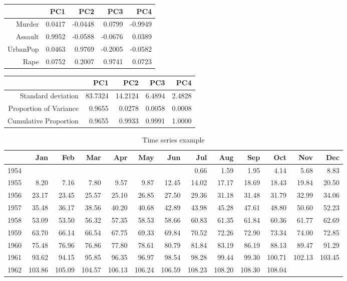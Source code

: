 \begin{table}[ht]
\centering
\begin{tabular}{rrrrr}
  \hline
 & PC1 & PC2 & PC3 & PC4 \\ 
  \hline
Murder & 0.0417 & -0.0448 & 0.0799 & -0.9949 \\ 
  Assault & 0.9952 & -0.0588 & -0.0676 & 0.0389 \\ 
  UrbanPop & 0.0463 & 0.9769 & -0.2005 & -0.0582 \\ 
  Rape & 0.0752 & 0.2007 & 0.9741 & 0.0723 \\ 
   \hline
\end{tabular}
\end{table}
\begin{table}[ht]
\centering
\begin{tabular}{rrrrr}
  \hline
 & PC1 & PC2 & PC3 & PC4 \\ 
  \hline
Standard deviation & 83.7324 & 14.2124 & 6.4894 & 2.4828 \\ 
  Proportion of Variance & 0.9655 & 0.0278 & 0.0058 & 0.0008 \\ 
  Cumulative Proportion & 0.9655 & 0.9933 & 0.9991 & 1.0000 \\ 
   \hline
\end{tabular}
\end{table}
\begin{table}[h]
\centering
\caption{Time series example} 
\begin{tabular}{rrrrrrrrrrrrr}
  \hline
 & Jan & Feb & Mar & Apr & May & Jun & Jul & Aug & Sep & Oct & Nov & Dec \\ 
  \hline
1954 &  &  &  &  &  &  & 0.66 & 1.59 & 1.95 & 4.14 & 5.68 & 8.83 \\ 
  1955 & 8.20 & 7.16 & 7.80 & 9.57 & 9.87 & 12.45 & 14.02 & 17.17 & 18.69 & 18.43 & 19.84 & 20.50 \\ 
  1956 & 23.17 & 23.45 & 25.57 & 25.10 & 26.85 & 27.50 & 29.36 & 31.18 & 31.48 & 31.79 & 32.99 & 34.06 \\ 
  1957 & 35.48 & 36.17 & 38.56 & 40.20 & 40.68 & 42.89 & 43.98 & 45.28 & 47.61 & 48.80 & 50.60 & 52.23 \\ 
  1958 & 53.09 & 53.50 & 56.32 & 57.35 & 58.53 & 58.66 & 60.83 & 61.35 & 61.84 & 60.36 & 61.77 & 62.69 \\ 
  1959 & 63.70 & 66.14 & 66.54 & 67.75 & 69.33 & 69.84 & 70.52 & 72.26 & 72.90 & 73.34 & 74.00 & 72.85 \\ 
  1960 & 75.48 & 76.96 & 76.86 & 77.80 & 78.61 & 80.79 & 81.84 & 83.19 & 86.19 & 88.13 & 89.47 & 91.29 \\ 
  1961 & 93.62 & 94.15 & 95.85 & 96.35 & 96.97 & 98.54 & 98.28 & 99.44 & 99.30 & 100.71 & 102.13 & 103.45 \\ 
  1962 & 103.86 & 105.09 & 104.57 & 106.13 & 106.24 & 106.59 & 108.23 & 108.20 & 108.30 & 108.04 &  &  \\ 
   \hline
\end{tabular}
\end{table}
